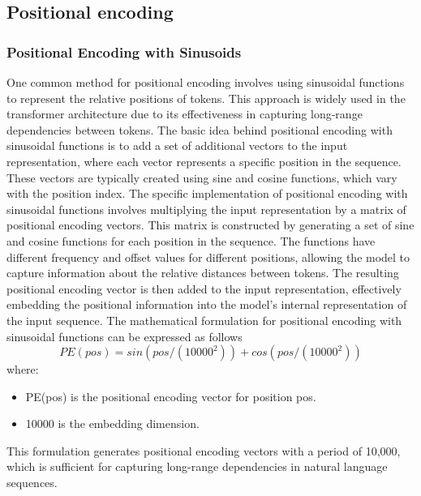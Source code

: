 \documentclass{article}
\begin{document}
\subsection{Positional encoding } 
\subsubsection{Positional Encoding with Sinusoids}
One common method for positional encoding involves using sinusoidal functions to represent the relative positions of tokens. This approach is widely used in the transformer architecture due to its effectiveness in capturing long-range dependencies between tokens.
The basic idea behind positional encoding with sinusoidal functions is to add a set of additional vectors to the input representation, where each vector represents a specific position in the sequence. These vectors are typically created using sine and cosine functions, which vary with the position index.
The specific implementation of positional encoding with sinusoidal functions involves multiplying the input representation by a matrix of positional encoding vectors. This matrix is constructed by generating a set of sine and cosine functions for each position in the sequence. The functions have different frequency and offset values for different positions, allowing the model to capture information about the relative distances between tokens.
The resulting positional encoding vector is then added to the input representation, effectively embedding the positional information into the model's internal representation of the input sequence.
The mathematical formulation for positional encoding with sinusoidal functions can be expressed as follows \cite{r5} \\
\[ PE(pos) = sin(pos / (10000^2)) + cos(pos / (10000^2)) \]
where:
\begin{itemize}
    \item PE(pos) is the positional encoding vector for position pos.
    \item 10000 is the embedding dimension.
\end{itemize}
This formulation generates positional encoding vectors with a period of 10,000, which is sufficient for capturing long-range dependencies in natural language sequences.
\end{document}
